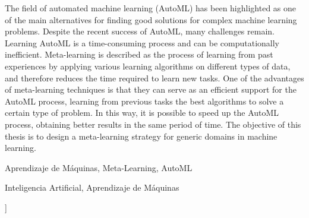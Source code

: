 \documentclass[a4paper,10pt,twocolumn]{article}
\begin{document}
\begin{enabstract}
	The field of automated machine learning (AutoML) has been highlighted as one of the main alternatives for finding good solutions for complex machine learning problems. Despite the recent success of AutoML, many challenges remain. Learning AutoML is a time-consuming process and can be computationally inefficient. Meta-learning is described as the process of learning from past experiences by applying various learning algorithms on different types of data, and therefore reduces the time required to learn new tasks. One of the advantages of meta-learning techniques is that they can serve as an efficient support for the AutoML process, learning from previous tasks the best algorithms to solve a certain type of problem. In this way, it is possible to speed up the AutoML process, obtaining better results in the same period of time. The objective of this thesis is to design a meta-learning strategy for generic domains in machine learning.

\end{enabstract}

\begin{keywords}
	Aprendizaje de Máquinas, Meta-Learning, AutoML
\end{keywords}

\begin{topics}
	Inteligencia Artificial, Aprendizaje de Máquinas
\end{topics}


\vspace{0.8cm}
]



\end{document}
